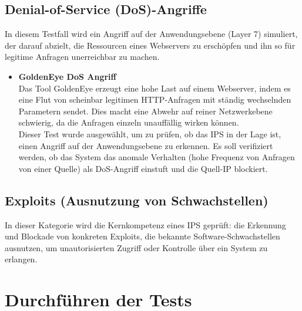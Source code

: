 \subsection{Denial-of-Service (DoS)-Angriffe}
In diesem Testfall wird ein Angriff auf der Anwendungsebene (Layer 7) simuliert, der darauf abzielt, die Ressourcen eines Webservers zu erschöpfen und ihn so für legitime Anfragen unerreichbar zu machen.\\
\begin{itemize}
\item \textbf{GoldenEye DoS Angriff}\\
 Das Tool GoldenEye erzeugt eine hohe Last auf einem Webserver, indem es eine Flut von scheinbar legitimen HTTP-Anfragen mit ständig wechselnden Parametern sendet. Dies macht eine Abwehr auf reiner Netzwerkebene schwierig, da die Anfragen einzeln unauffällig wirken können.\\
Dieser Test wurde ausgewählt, um zu prüfen, ob das IPS in der Lage ist, einen Angriff auf der Anwendungsebene zu erkennen. Es soll verifiziert werden, ob das System das anomale Verhalten (hohe Frequenz von Anfragen von einer Quelle) als DoS-Angriff einstuft und die Quell-IP blockiert.
\end{itemize}

\subsection{Exploits (Ausnutzung von Schwachstellen)}
In dieser Kategorie wird die Kernkompetenz eines IPS geprüft: die Erkennung und Blockade von konkreten Exploits, die bekannte Software-Schwachstellen ausnutzen, um unautorisierten Zugriff oder Kontrolle über ein System zu erlangen.


\section{Durchführen der Tests}
